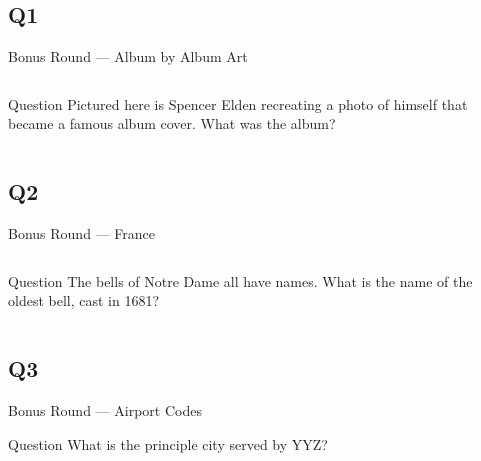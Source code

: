 \documentclass[11pt]{beamer}
\begin{document}
\subsection*{Q1}
\begin{frame}[t]{Bonus Round --- Album by Album Art}
\begin{columns}[T,totalwidth=\linewidth]
\begin{column}{0.32\linewidth}
\begin{block}{Question}
Pictured here is Spencer Elden recreating a photo of himself that became a famous album cover. What was the album?
\end{block}
\end{column}
\begin{column}{0.65\linewidth}
\begin{center}
\texttt{[image: \{Images/nevermind]}.jpg}
\end{center}
\end{column}
\end{columns}
\end{frame}
\subsection*{Q2}
\begin{frame}[t]{Bonus Round --- France}
\begin{columns}[T,totalwidth=\linewidth]
\begin{column}{0.32\linewidth}
\begin{block}{Question}
The bells of Notre Dame all have names.  What is the name of the oldest bell, cast in 1681?
\end{block}
\end{column}
\begin{column}{0.65\linewidth}
\begin{center}
\texttt{[image: \{Images/emannuelbell]}.jpg}
\end{center}
\end{column}
\end{columns}
\end{frame}
\subsection*{Q3}
\begin{frame}[t]{Bonus Round --- Airport Codes}
\begin{block}{Question}
What is the principle city served by YYZ\@?
\end{block}
\end{frame}
\end{document}

